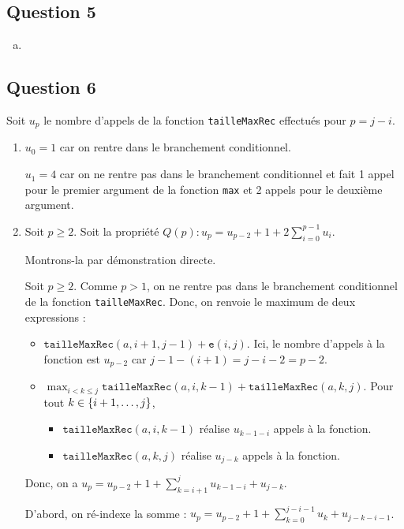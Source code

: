 \documentclass[12pt,a4paper]{article}
\begin{document}
\subsection*{Question 5}
\begin{enumerate}[a)]
 \item {}
\end{enumerate}


\subsection*{Question 6}
Soit \( u_p \) le nombre d'appels de la fonction \texttt{tailleMaxRec} effectu\'es pour \( p = j-i \).
\begin{enumerate}
	\item \( u_0 = 1 \) car on rentre dans le branchement conditionnel.
	
	\( u_1 = 4 \) car on ne rentre pas dans le branchement conditionnel et fait 1 appel pour le premier argument de la fonction \texttt{max} et 2 appels pour le deuxi\`eme argument.
	\item Soit \( p \geq 2 \). Soit la propri\'et\'e \( Q(p): u_p = u_{p-2} + 1 + 2\sum_{i=0}^{p-1}{u_i} \). 
	
	Montrons-la par d\'emonstration directe.
	
	Soit $p\geq 2$. Comme $p > 1$, on ne rentre pas dans le branchement conditionnel de la fonction \texttt{tailleMaxRec}. Donc, on renvoie le maximum de deux expressions :
	
	\begin{itemize}
		\item $\texttt{tailleMaxRec}(a,i+1,j-1) + \texttt{e}(i,j)$. Ici, le nombre d'appels \`a la fonction est $u_{p-2}$ car $j-1-(i+1)=j-i-2=p-2$.
		\item \( \displaystyle\max_{i < k \leq j} {\texttt{tailleMaxRec}(a,i,k-1)+\texttt{tailleMaxRec}(a,k,j)} \). Pour tout $\\k \in \{i+1, \dotsc, j\}$, 
		\begin{itemize}
			\item $\texttt{tailleMaxRec}(a,i,k-1)$ r\'ealise $u_{k-1-i}$ appels \`a la fonction. 
			\item $\texttt{tailleMaxRec}(a,k,j)$ r\'ealise $u_{j-k}$ appels \`a la fonction.
		\end{itemize}
	\end{itemize}
	Donc, on a $u_p=u_{p-2}+1+\sum_{k=i+1}^{j}{u_{k-1-i}+u_{j-k}}$. 
	
	D'abord, on r\'e-indexe la somme : $u_p=u_{p-2}+1+\sum_{k=0}^{j-i-1}{u_{k}+u_{j-k-i-1}}$. 
	

\end{enumerate}
\end{document}
